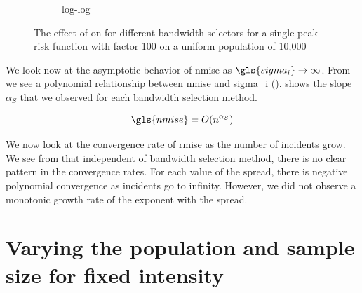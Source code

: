 \begin{figure}[htbp]
\begin{subfigure}[t]{0.49\textwidth}
        \caption{ log-log}
        \label{fig:ise:unif_Spreads_1h:nmise_log_log}
    \end{subfigure}
    \caption[: by risk ]
        {The effect of  on  for different bandwidth selectors for a single-peak risk function with \gls{factor} 100 on a uniform population of 10,000}
    \label{fig:ise:unif_Spreads_1h}
\end{figure}

We look now at the asymptotic behavior of \gls{nmise} as $\gls{sigma_i} \to \infty$.
From  we see a polynomial relationship between \gls{nmise} and \gls{sigma_i} ().
 shows the slope $\alpha_S$ that we observed for each bandwidth selection method.

\begin{equation}
    \label{eq:nmise:spread}
    \gls{nmise} = O(n^{\alpha_S})
\end{equation}


We now look at the convergence rate of \gls{rmise} as the number of incidents grow.
We see from  that independent of bandwidth selection method,
there is no clear pattern in the convergence rates.
For each value of the \gls{spread}, there is negative polynomial convergence as incidents go to infinity.
However, we did not observe a monotonic growth rate of the exponent with the spread.




\section{Varying the population and sample size for fixed intensity}
\label{sec:results:unifNpop_1h}

